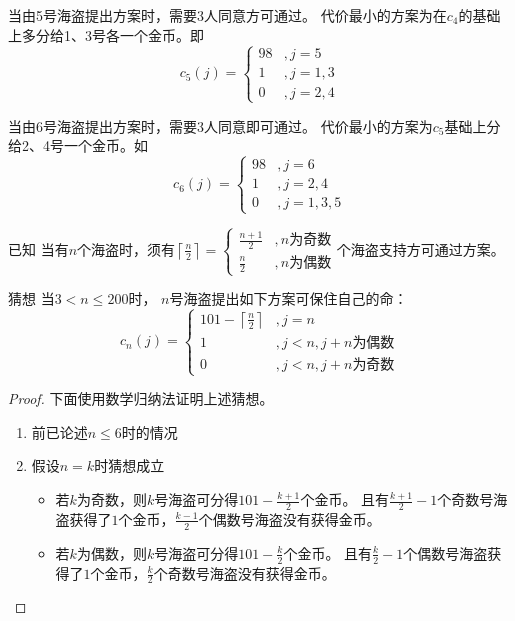 \documentclass[answers]{exam}
\begin{document}
\begin{questions}
\begin{solution}
        当由5号海盗提出方案时，需要3人同意方可通过。
        代价最小的方案为在$c_4$的基础上多分给1、3号各一个金币。即$$
            c_5(j) = \begin{cases}
                98 & , j=5   \\
                1  & , j=1,3 \\
                0  & , j=2,4
            \end{cases}
        $$

        当由6号海盗提出方案时，需要3人同意即可通过。
        代价最小的方案为$c_5$基础上分给2、4号一个金币。如$$
            c_6(j) = \begin{cases}
                98 & , j=6     \\
                1  & , j=2,4   \\
                0  & , j=1,3,5
            \end{cases}
        $$

        \textsf{已知} \quad 当有$n$个海盗时，须有$
            \left\lceil \frac{n}{2} \right\rceil = \begin{cases}
                \frac{n+1}{2} & , n \text{为奇数} \\
                \frac{n}{2}   & , n \text{为偶数}
            \end{cases}
        $个海盗支持方可通过方案。

        \textsf{猜想} \quad 当$3 < n \leq 200$时， $n$号海盗提出如下方案可保住自己的命：$$
            c_n(j) = \begin{cases}
                101-\left\lceil \frac{n}{2} \right\rceil & , j=n                     \\
                1                                        & , j<n , j+n \text{为偶数} \\
                0                                        & , j<n , j+n \text{为奇数}
            \end{cases}
        $$

        \begin{proof}
            下面使用数学归纳法证明上述猜想。
            \begin{enumerate}
                \item 前已论述$n \leq 6$时的情况
                \item {
                      假设$n=k$时猜想成立
                      \begin{itemize}
                          \item {
                                若$k$为奇数，则$k$号海盗可分得$101-\frac{k+1}{2}$个金币。
                                且有$\frac{k+1}{2}-1$个奇数号海盗获得了$1$个金币，$\frac{k-1}{2}$个偶数号海盗没有获得金币。
                                }
                          \item {
                                若$k$为偶数，则$k$号海盗可分得$101-\frac{k}{2}$个金币。
                                且有$\frac{k}{2}-1$个偶数号海盗获得了$1$个金币，$\frac{k}{2}$个奇数号海盗没有获得金币。
                                }
                      \end{itemize}

}
\end{enumerate}
\end{proof}
\end{solution}
\end{questions}
\end{document}
